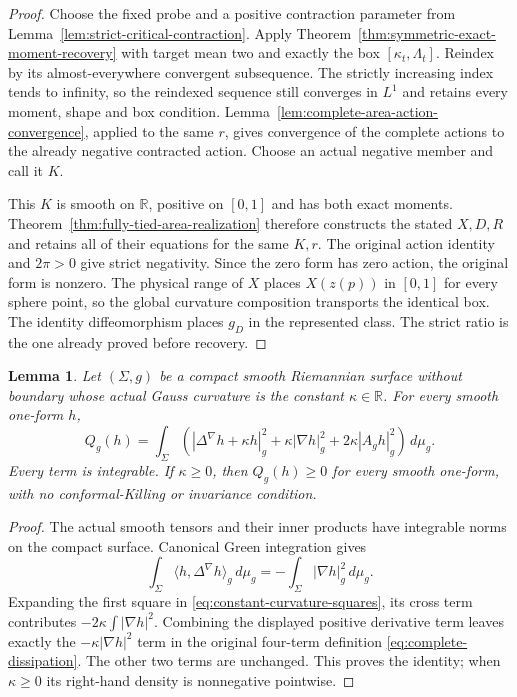 \documentclass[11pt]{article}
\newtheorem{lemma}[theorem]{Lemma}
\newcommand{\R}{\mathbb R}
\begin{document}
\begin{proof}
Choose the fixed probe and a positive contraction parameter from
Lemma~\ref{lem:strict-critical-contraction}.
Apply Theorem~\ref{thm:symmetric-exact-moment-recovery} with target mean two
and exactly the box $[\kappa_t,\Lambda_t]$.
Reindex by its almost-everywhere convergent subsequence. The strictly
increasing index tends to infinity, so the reindexed sequence still
converges in $L^1$ and retains every moment, shape and box condition.
Lemma~\ref{lem:complete-area-action-convergence}, applied to the same $r$,
gives convergence of the complete actions to the already negative
contracted action. Choose an actual negative member and call it $K$.

This $K$ is smooth on $\R$, positive on $[0,1]$ and has both exact moments.
Theorem~\ref{thm:fully-tied-area-realization} therefore constructs the
stated $X,D,R$ and retains all of their equations for the same $K,r$.
The original action identity and $2\pi>0$ give strict negativity.
Since the zero form has zero action, the original form is nonzero.
The physical range of $X$ places $X(z(p))$ in $[0,1]$ for every sphere point,
so the global curvature composition transports the identical box.
The identity diffeomorphism places $g_D$ in the represented class.
The strict ratio is the one already proved before recovery.
\end{proof}

\begin{lemma}\label{lem:constant-curvature-square-identity}
Let $(\Sigma,g)$ be a compact smooth Riemannian surface without boundary
whose actual Gauss curvature is the constant $\kappa\in\R$.
For every smooth one-form $h$,
\begin{equation}\label{eq:constant-curvature-squares}
 Q_g(h)=\int_\Sigma
 \left(|\Delta^\nabla h+\kappa h|_g^2
       +\kappa|\nabla h|_g^2+2\kappa|A_g h|_g^2\right)\,d\mu_g.
\end{equation}
Every term is integrable. If $\kappa\geq0$, then $Q_g(h)\geq0$ for every
smooth one-form, with no conformal-Killing or invariance condition.
\end{lemma}

\begin{proof}
The actual smooth tensors and their inner products have integrable norms
on the compact surface. Canonical Green integration gives
\[
 \int_\Sigma\langle h,\Delta^\nabla h\rangle_g\,d\mu_g
 =-\int_\Sigma|\nabla h|_g^2\,d\mu_g.
\]
Expanding the first square in \eqref{eq:constant-curvature-squares}, its
cross term contributes $-2\kappa\int|\nabla h|^2$.
Combining the displayed positive derivative term leaves exactly the
$-\kappa|\nabla h|^2$ term in the original four-term definition
\eqref{eq:complete-dissipation}. The other two terms are unchanged.
This proves the identity; when $\kappa\geq0$ its right-hand density is
nonnegative pointwise.
\end{proof}
\end{document}
